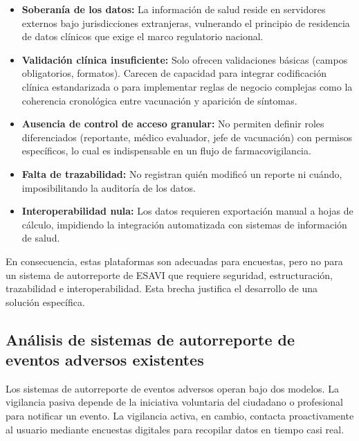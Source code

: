 \begin{itemize}

\item \textbf{Soberanía de los datos:} La información de salud reside en servidores externos bajo jurisdicciones extranjeras, vulnerando el principio de residencia de datos clínicos que exige el marco regulatorio nacional.

\item \textbf{Validación clínica insuficiente:} Solo ofrecen validaciones básicas (campos obligatorios, formatos). Carecen de capacidad para integrar codificación clínica estandarizada o para implementar reglas de negocio complejas como la coherencia cronológica entre vacunación y aparición de síntomas.

\item \textbf{Ausencia de control de acceso granular:} No permiten definir roles diferenciados (reportante, médico evaluador, jefe de vacunación) con permisos específicos, lo cual es indispensable en un flujo de farmacovigilancia.

\item \textbf{Falta de trazabilidad:} No registran quién modificó un reporte ni cuándo, imposibilitando la auditoría de los datos.

\item \textbf{Interoperabilidad nula:} Los datos requieren exportación manual a hojas de cálculo, impidiendo la integración automatizada con sistemas de información de salud.

\end{itemize}

En consecuencia, estas plataformas son adecuadas para encuestas, pero no para un sistema de autorreporte de ESAVI que requiere seguridad, estructuración, trazabilidad e interoperabilidad. Esta brecha justifica el desarrollo de una solución específica.

\subsection{Análisis de sistemas de autorreporte de eventos adversos existentes}
\label{subsection:sistemas_autorreporte}

Los sistemas de autorreporte de eventos adversos operan bajo dos modelos. 
La vigilancia pasiva depende de la iniciativa voluntaria del ciudadano o profesional para notificar un evento. 
La vigilancia activa, en cambio, contacta proactivamente al usuario mediante encuestas digitales para recopilar datos en tiempo casi real.

